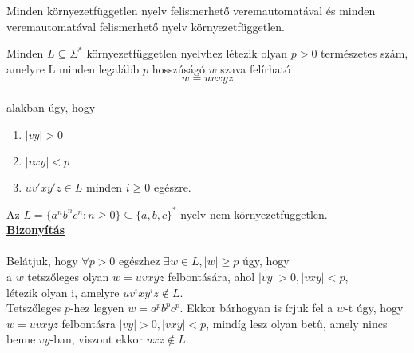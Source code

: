 \documentclass{beamer}
\newcommand{\msmallskip}{\vspace{0.3em}}
\newcommand{\mmedskip}{\vspace{0.5em}}
\newcommand{\mbigskip}{\vspace{1em}}
\begin{document}
\begin{frame}
\begin{tcolorbox}[squeezed title={Tétel: Környezetfüggetlen nyelv és veremautomata}]
Minden környezetfüggetlen nyelv felismerhető veremautomatával és minden veremautomatával felismerhető nyelv környezetfüggetlen.
\end{tcolorbox}

\begin{tcolorbox}[title={Tétel: Pumpáló lemma környezetfüggetlen nyelvre}]
Minden $L \subseteq {\Sigma}^*$ környezetfüggetlen nyelvhez létezik olyan $p > 0$ természetes szám, amelyre L minden legalább $p$ hosszúságó $w$ szava felírható $$w = uvxyz$$\\
alakban úgy, hogy\\
\begin{enumerate}
\item $|vy| > 0$
\item $|vxy| < p$
\item $uv'xy'z \in L$ minden $i \geq 0$ egészre.
\end{enumerate}

\end{tcolorbox}
\end{frame}

\begin{frame}
\begin{tcolorbox}[title={Tétel: Példa nem környezetfüggetlen nyelvre 1}]
Az $L = \{a^nb^nc^n : n \geq 0 \} \subseteq \{a, b, c\}^*$ nyelv nem környezetfüggetlen.\\
\tcblower
\msmallskip
\underline{\textbf{Bizonyítás}}\\
\mmedskip
\\
Belátjuk, hogy ${\forall}p > 0$ egészhez ${\exists}w \in L, |w| \geq p$ úgy, hogy\\
a $w$ tetszőleges olyan $w = uvxyz$ felbontására, ahol $|vy| > 0, |vxy| < p$,\\
létezik olyan i, amelyre $uv^ixy^iz \notin L$.\\
\mbigskip
Tetszőleges $p$-hez legyen $w = a^pb^pc^p$. Ekkor bárhogyan is írjuk fel a $w$-t úgy, hogy $w = uvxyz$ felbontásra $|vy| > 0, |vxy| < p$, mindíg lesz olyan betű, amely nincs benne $vy$-ban, viszont ekkor $uxz \notin L$.
\end{tcolorbox}
\end{frame}
\end{document}
